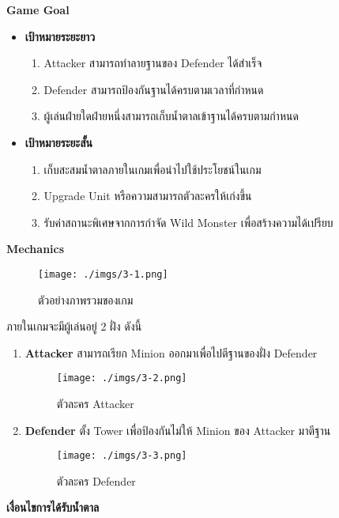 \documentclass[12pt,oneside,openright,a4paper]{cpe-thai-project}
\begin{document}
\textbf{Game Goal}
\begin{itemize}
  \item{\textbf{เป้าหมายระยะยาว}}
  \begin{enumerate}
    \item Attacker สามารถทำลายฐานของ Defender ได้สำเร็จ
    \item Defender สามารถป้องกันฐานได้ครบตามเวลาที่กำหนด
    \item ผู้เล่นฝ่ายใดฝ่ายหนึ่งสามารถเก็บน้ำตาลเข้าฐานได้ครบตามกำหนด
  \end{enumerate}
  
  \item{\textbf{เป้าหมายระยะสั้น}}
  \begin{enumerate}
    \item เก็บสะสมน้ำตาลภายในเกมเพื่อนำไปใช้ประโยชน์ในเกม
    \item Upgrade Unit หรือความสามารถตัวละครให้เก่งขึ้น
    \item รับค่าสถานะพิเศษจากการกำจัด Wild Monster เพื่อสร้างความได้เปรียบ
  \end{enumerate}
\end{itemize}

\textbf{Mechanics} 

\begin{figure}[H]\centering
  \texttt{[image: ./imgs/3-1.png]}
  \caption{ตัวอย่างภาพรวมของเกม}\label{fig:3-1}
\end{figure}

ภายในเกมจะมีผู้เล่นอยู่ 2 ฝั่ง ดังนี้
\begin{enumerate}
  \item \textbf{Attacker} สามารถเรียก Minion ออกมาเพื่อไปตีฐานของฝั่ง Defender
  \begin{figure}[H]\centering
    \texttt{[image: ./imgs/3-2.png]}
    \caption{ตัวละคร Attacker}\label{fig:3-2}
  \end{figure}

  \pagebreak
  \item \textbf{Defender} ตั้ง Tower เพื่อป้องกันไม่ให้ Minion ของ Attacker มาตีฐาน
  \begin{figure}[H]\centering
    \texttt{[image: ./imgs/3-3.png]}
    \caption{ตัวละคร Defender}\label{fig:3-3}
  \end{figure}
\end{enumerate}

\textbf{เงื่อนไขการได้รับน้ำตาล}
\end{document}
